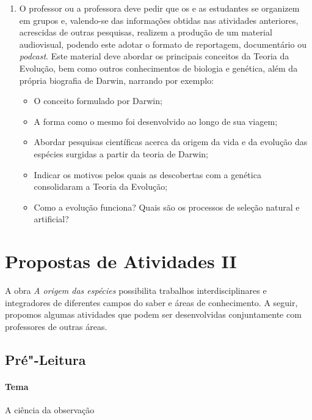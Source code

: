 \documentclass[11pt]{extarticle}
\begin{document}
\begin{enumerate}

	\item
	O professor ou a professora deve pedir que os e as estudantes se organizem em grupos e,
	valendo-se das informações obtidas nas atividades anteriores,
	acrescidas de outras pesquisas, realizem a produção de um material audiovisual,
	podendo este adotar o formato de reportagem, documentário ou \textit{podcast}. Este
	material deve abordar os principais conceitos da Teoria da Evolução, bem como
	outros conhecimentos de biologia e genética, além da própria biografia de
	Darwin, narrando por exemplo:

\begin{itemize} 
	\item O conceito formulado por Darwin; 
	\item A forma como
    o mesmo foi desenvolvido ao longo de sua viagem; 
    \item Abordar pesquisas
    científicas acerca da origem da vida e da evolução das espécies surgidas
    a partir da teoria de Darwin; 
    \item Indicar os motivos pelos quais as
 	descobertas com a genética consolidaram a Teoria da Evolução; 
 	\item Como
	a evolução funciona? Quais são os processos de seleção natural e artificial?
\end{itemize}

\end{enumerate}


\section{Propostas de Atividades II}

A obra \emph{A origem das espécies} possibilita trabalhos interdisciplinares
e integradores de diferentes campos do saber e áreas de conhecimento. A seguir,
propomos algumas atividades que podem ser desenvolvidas conjuntamente com
professores de outras áreas. 

\subsection{Pré"-Leitura}

\paragraph{Tema} A ciência da observação
\end{document}
